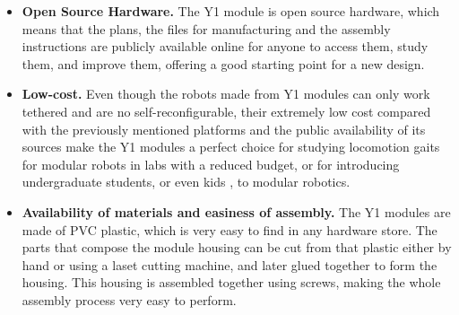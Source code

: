 \begin{itemize}
	\item \textbf{Open Source Hardware.} The Y1 module is open source hardware, which means that the plans, the files for manufacturing and the assembly instructions are publicly available online for anyone to access them, study them, and improve them, offering a good starting point for a new design. 
	
	\item \textbf{Low-cost.} Even though the robots made from Y1 modules can only work tethered and are no self-reconfigurable, their extremely low cost compared with the previously mentioned platforms and the public availability of its sources make the Y1 modules a perfect choice for studying locomotion gaits for modular robots in labs with a reduced budget, or for introducing undergraduate students, or even kids \cite{gonzalez-gomez_website:taller_2010}, to modular robotics.
	
	\item \textbf{Availability of materials and easiness of assembly.} The Y1 modules are made of PVC plastic, which is very easy to find in any hardware store. The parts that compose the module housing can be cut from that plastic either by hand or using a laset cutting machine, and later glued together to form the housing. This housing is assembled together using screws, making the whole assembly process very easy to perform.\\
	
\end{itemize}

